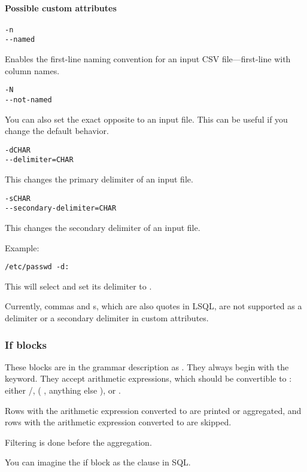 \paragraph{Possible custom attributes}

\begin{verbatim}
-n
--named
\end{verbatim}
Enables the first-line naming convention for an input CSV file---first-line with column names.

\begin{verbatim}
-N
--not-named
\end{verbatim}
You can also set the exact opposite to an input file. This can be useful if you change the default behavior.

\begin{verbatim}
-dCHAR
--delimiter=CHAR
\end{verbatim}
This changes the primary delimiter of an input file.

\begin{verbatim}
-sCHAR
--secondary-delimiter=CHAR
\end{verbatim}
This changes the secondary delimiter of an input file.

Example:
\begin{verbatim}
/etc/passwd -d:
\end{verbatim}
This will select  and set its delimiter to \icode{:}.

Currently, commas and s, which are also quotes in LSQL, are not supported as a delimiter or a secondary delimiter in  custom attributes.

\subsubsection{If blocks}
These blocks are in the grammar description as .
They always begin with the  keyword. 
They accept arithmetic expressions, which should be convertible to : 
either  /,  ( , anything else ), or . 

Rows with the arithmetic expression converted to   are printed or aggregated, and 
rows with the arithmetic expression converted to   are skipped.

Filtering is done before the aggregation.

You can imagine the if block as the  clause in SQL.

